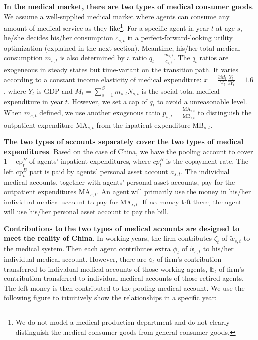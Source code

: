 \textbf{In the medical market, there are two types of medical consumer
goods}. We assume a well-supplied medical market where agents can
consume any amount of medical service as they like\footnote{We do not
  model a medical production department and do not clearly distinguish
  the medical consumer goods from general consumer goods.}. For a
specific agent in year \(t\) at age \(s\), he/she decides his/her
consumption \(c_{s,t}\) in a perfect-forward-looking utility
optimization (explained in the next section). Meantime, his/her total
medical consumption \(m_{s,t}\) is also determined by a ratio
\(q_{t} = \frac{m_{s,t}}{c_{s,t}}\). The \(q_{t}\) ratios are exogeneous
in steady states but time-variant on the transition path. It varies
according to a constant income elasticity of medical expenditure:
\(x = \frac{\partial M_{t}}{M_{t}}\frac{Y_{t}}{\partial Y_{t}} = 1.6\),
where \(Y_{t}\) is GDP and \(M_{t} = \sum_{s = 1}^{S}{m_{s,t}N_{s,t}}\)
is the social total medical expenditure in year \(t\). However, we set a
cap of \(q_{t}\) to avoid a unreasonable level. When \(m_{s,t}\)
defined, we use another exogenous ratio
\(p_{s,t} = \frac{\text{MA}_{s,t}}{\text{MB}_{s,t}}\) to distinguish the
outpatient expenditure \(\text{MA}_{s,t}\) from the inpatient
expenditure \(\text{MB}_{s,t}\).

\textbf{The two types of accounts separately cover the two types of
medical expenditures}. Based on the case of China, we have the pooling
account to cover \(1 - \text{cp}_{t}^{B}\) of agents' inpatient
expenditures, where \(cp_{t}^{B}\) is the copayment rate. The left
\(\text{cp}_{t}^{B}\) part is paid by agents' personal asset account
\(a_{s,t}\). The individual medical accounts, together with agents'
personal asset accounts, pay for the outpatient expenditures
\(\text{MA}_{s,t}\). An agent will primarily use the money in his/her
individual medical account to pay for \(\text{MA}_{s,t}\). If no money
left there, the agent will use his/her personal asset account to pay the
bill.

\textbf{Contributions to the two types of medical accounts are designed
to meet the reality of China}. In working years, the firm contributes
\(\zeta_{t}\) of \({\widetilde{w}}_{s,t}\) to the medical system. Then
each agent contributes extra \(\phi_{t}\) of \({\widetilde{w}}_{s,t}\)
to his/her individual medical account. However, there are
\(\mathbb{a}_{t}\) of firm's contribution transferred to individual
medical accounts of those working agents, \(\mathbb{b}_{t}\) of firm's
contribution transferred to individual medical accounts of those retired
agents. The left money is then contributed to the pooling medical
account. We use the following figure to intuitively show the
relationships in a specific year:

